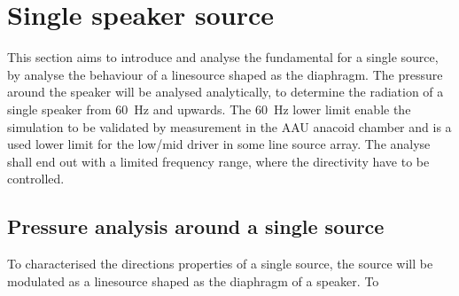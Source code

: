 \section{Single speaker source}
This section aims to introduce and analyse the fundamental for a single source, by analyse the behaviour of a linesource shaped as the diaphragm. The pressure around the speaker will be analysed analytically, to determine the radiation of a single speaker from \SI{60}{\hertz} and upwards. The \SI{60}{\hertz} lower limit enable the simulation to be validated by measurement in the AAU anacoid chamber and is a used lower limit for the low/mid driver in some line source array.  The analyse shall end out with a limited frequency range, where the directivity have to be controlled.

\subsection{Pressure analysis around a single source}
To characterised the directions properties of a single source, the source will be modulated as a linesource shaped as the diaphragm of a speaker. To 